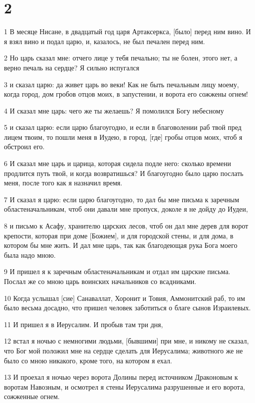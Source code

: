 \chapter{2}

\par 1 В месяце Нисане, в двадцатый год царя Артаксеркса, [было] перед ним вино. И я взял вино и подал царю, и, казалось, не был печален перед ним.
\par 2 Но царь сказал мне: отчего лице у тебя печально; ты не болен, этого нет, а верно печаль на сердце? Я сильно испугался
\par 3 и сказал царю: да живет царь во веки! Как не быть печальным лицу моему, когда город, дом гробов отцов моих, в запустении, и ворота его сожжены огнем!
\par 4 И сказал мне царь: чего же ты желаешь? Я помолился Богу небесному
\par 5 и сказал царю: если царю благоугодно, и если в благоволении раб твой пред лицем твоим, то пошли меня в Иудею, в город, [где] гробы отцов моих, чтоб я обстроил его.
\par 6 И сказал мне царь и царица, которая сидела подле него: сколько времени продлится путь твой, и когда возвратишься? И благоугодно было царю послать меня, после того как я назначил время.
\par 7 И сказал я царю: если царю благоугодно, то дал бы мне письма к заречным областеначальникам, чтоб они давали мне пропуск, доколе я не дойду до Иудеи,
\par 8 и письмо к Асафу, хранителю царских лесов, чтоб он дал мне дерев для ворот крепости, которая при доме [Божием], и для городской стены, и для дома, в котором бы мне жить. И дал мне царь, так как благодеющая рука Бога моего была надо мною.
\par 9 И пришел я к заречным областеначальникам и отдал им царские письма. Послал же со мною царь воинских начальников со всадниками.
\par 10 Когда услышал [сие] Санаваллат, Хоронит и Товия, Аммонитский раб, то им было весьма досадно, что пришел человек заботиться о благе сынов Израилевых.
\par 11 И пришел я в Иерусалим. И пробыв там три дня,
\par 12 встал я ночью с немногими людьми, [бывшими] при мне, и никому не сказал, что Бог мой положил мне на сердце сделать для Иерусалима; животного же не было со мною никакого, кроме того, на котором я ехал.
\par 13 И проехал я ночью через ворота Долины перед источником Драконовым к воротам Навозным, и осмотрел я стены Иерусалима разрушенные и его ворота, сожженные огнем.
